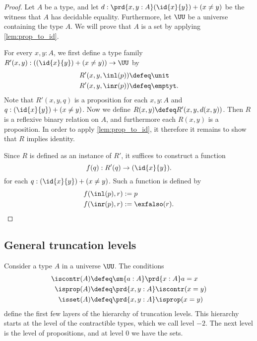 \begin{proof}
  Let $A$ be a type, and let $d:\prd{x,y:A}(\id{x}{y})+ (x\neq y)$ be the witness that $A$ has decidable equality. Furthermore, let $\UU$ be a universe containing the type $A$. We will prove that $A$ is a set by applying \cref{lem:prop_to_id}.

  For every $x,y:A$, we first define a type family $R'(x,y):((\id{x}{y})+{(x\neq y)})\to\UU$ by
\begin{align*}
R'(x,y,\inl(p)) & \defeq \unit \\
R'(x,y,\inr(p)) & \defeq \emptyt.
\end{align*}
Note that $R'(x,y,q)$ is a proposition for each $x,y:A$ and $q:(\id{x}{y})+(x\neq y)$. 
Now we define $R(x,y)\defeq R'(x,y,d(x,y))$. Then $R$ is a reflexive binary relation on $A$, and furthermore each $R(x,y)$ is a proposition. In order to apply \cref{lem:prop_to_id}, it therefore it remains to show that $R$ implies identity. 

Since $R$ is defined as an instance of $R'$, it suffices to construct a function
\begin{equation*}
  f(q) : R'(q)\to (\id{x}{y}). 
\end{equation*}
for each $q:(\id{x}{y})+(x\neq y)$. Such a function is defined by
\begin{align*}
  f(\inl(p),r) & := p \\
  f(\inr(p),r) & := \exfalso(r).\qedhere
\end{align*}
\end{proof}

\subsection{General truncation levels}

Consider a type $A$ in a universe $\UU$. The conditions
\begin{align*}
  \iscontr(A) & \defeq \sm{a:A}\prd{x:A}a=x \\
  \isprop(A) & \defeq \prd{x,y:A}\iscontr(x=y) \\
  \isset(A) & \defeq \prd{x,y:A}\isprop(x=y)
\end{align*}
define the first few layers of the hierarchy of truncation levels. This hierarchy starts at the level of the contractible types, which we call level $-2$. The next level is the level of propositions, and at level $0$ we have the sets.

